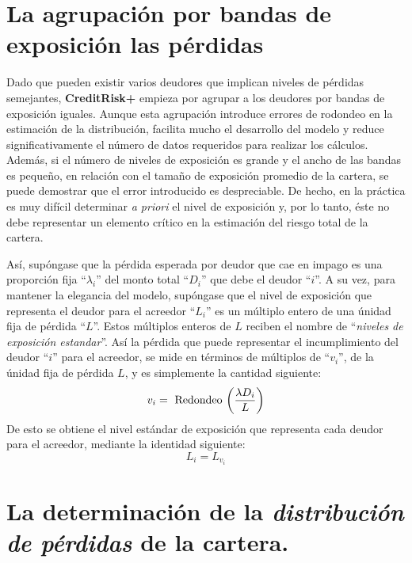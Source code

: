 \documentclass[
  12pt,
]{krantz}
\theoremstyle{definition}
\theoremstyle{definition}
\theoremstyle{definition}
\theoremstyle{remark}
\begin{document}
\hypertarget{la-agrupacion-por-bandas-de-exposicion-las-perdidas}{%
\section{La agrupación por bandas de exposición las pérdidas}\label{la-agrupacion-por-bandas-de-exposicion-las-perdidas}}

Dado que pueden existir varios deudores que implican niveles de pérdidas semejantes, \textbf{CreditRisk+} empieza por agrupar a los deudores por bandas de exposición iguales. Aunque esta agrupación introduce errores de rodondeo en la estimación de la distribución, facilita mucho el desarrollo del modelo y reduce significativamente el número de datos requeridos para realizar los cálculos. Además, si el número de niveles de exposición es grande y el ancho de las bandas es pequeño, en relación con el tamaño de exposición promedio de la cartera, se puede demostrar que el error introducido es despreciable. De hecho, en la práctica es muy difícil determinar \emph{a priori} el nivel de exposición y, por lo tanto, éste no debe representar un elemento crítico en la estimación del riesgo total de la cartera.

Así, supóngase que la pérdida esperada por deudor que cae en impago es una proporción fija ``\(\lambda_i\)'' del monto total ``\(D_i\)'' que debe el deudor ``\(i\)''. A su vez, para mantener la elegancia del modelo, supóngase que el nivel de exposición que representa el deudor para el acreedor ``\(L_i\)'' es un múltiplo entero de una únidad fija de pérdida ``\(L\)''. Estos múltiplos enteros de \(L\) reciben el nombre de ``\emph{niveles de exposición estandar}''. Así la pérdida que puede representar el incumplimiento del deudor ``\(i\)'' para el acreedor, se mide en términos de múltiplos de ``\(v_i\)'', de la únidad fija de pérdida \(L\), y es simplemente la cantidad siguiente:\[v_i=\textrm{ Redondeo }\bigg{(}\frac{\lambda D_i}{L}\bigg{)}\]
De esto se obtiene el nivel estándar de exposición que representa cada deudor para el acreedor, mediante la identidad siguiente:\[L_i=L_{v_i}\]

\hypertarget{la-determinacion-de-la-distribucion-de-perdidas-de-la-cartera.}{%
\section{\texorpdfstring{La determinación de la \emph{distribución de pérdidas} de la cartera.}{La determinación de la distribución de pérdidas de la cartera.}}\label{la-determinacion-de-la-distribucion-de-perdidas-de-la-cartera.}}
\end{document}
